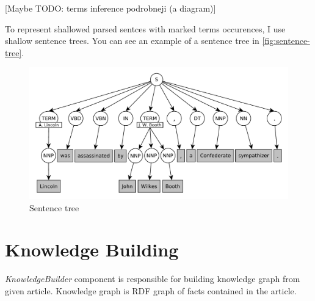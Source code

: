 \documentclass[a4paper, 12pt, twoside]{fithesis2}		%
\renewcommand{\_}{\leavevmode \kern0.07em\vbox{\hrule width0.4em}}
\begin{document}

[Maybe TODO: terms inference podrobneji (a diagram)]

To represent shallowed parsed sentces with marked terms occurences,
I use shallow sentence trees.
You can see an example of a sentence tree in \autoref{fig:sentence-tree}.

\begin{figure}[h]
  \centering
  \includegraphics[width=\textwidth]{images/sentence-tree.pdf}
  \caption{Sentence tree}
  \label{fig:sentence-tree}
\end{figure}

\section{Knowledge Building}
\label{sec:smartoo-knowledge}

\textit{KnowledgeBuilder} component is responsible for building knowledge graph from given article.
Knowledge graph is RDF graph of facts contained in the article.
\end{document}
